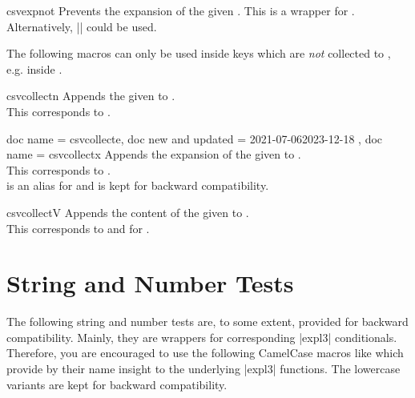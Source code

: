 \documentclass[a4paper,11pt]{ltxdoc}
\begin{document}
\begin{docCommand}[doc new=2021-07-06]{csvexpnot}{}
  Prevents the expansion of the given . This is a wrapper
  for .
  Alternatively, |\noexpand| could be used.
\end{docCommand}

The following macros can only be used inside keys which are \emph{not}
collected to , e.g. inside .

\begin{docCommand}[doc new and updated={2021-07-06}{2023-12-17}]{csvcollectn}{}
  Appends the given  to .\\
  This corresponds to .
\end{docCommand}


\begin{docCommands}[
      doc parameter = \marg{code}
    ]
  {
    { doc name = csvcollecte, doc new and updated = {2021-07-06}{2023-12-18} },
    { doc name = csvcollectx }
  }
  Appends the expansion of the given  to .\\
  This corresponds to .\\
   is an alias for  and is kept for backward compatibility.
\end{docCommands}

\begin{docCommand}[doc new and updated={2021-07-06}{2023-12-17}]{csvcollectV}{}
  Appends the content of the given  to .\\
  This corresponds to  and  for
  .
\end{docCommand}


\clearpage
\section{String and Number Tests}\label{sec:stringtests}%

The following string and number tests are, to some extent, provided for
backward compatibility.
Mainly, they are wrappers for corresponding |expl3| conditionals.
Therefore, you are encouraged to use the following CamelCase macros
like  which provide by their name insight
to the underlying |expl3| functions. The lowercase variants are kept
for backward compatibility.
\medskip
\end{document}
